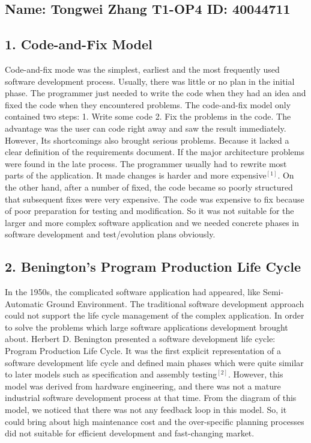 \documentclass[11pt]{report}
\begin{document}
\subsection*{Name: Tongwei Zhang\hspace{2cm} T1-OP4 \hspace{2cm}ID: 40044711 }
\subsection*{1. Code-and-Fix Model}
Code-and-fix mode was the simplest, earliest and the most frequently used software development process. Usually, there was little or no plan in the initial phase. The programmer just needed to write the code when they had an idea and fixed the code when they encountered problems. The code-and-fix model only contained two steps: 1. Write some code 2. Fix the problems in the code. The advantage was the user can code right away and saw the result immediately. However, Its shortcomings also brought serious problems. Because it lacked a clear definition of the requirements document. If the major architecture problems were found in the late process. The programmer usually had to rewrite most parts of the application. It made changes is harder and more expensive$^{[1]}$. On the other hand, after a number of fixed, the code became so poorly structured that subsequent fixes were very expensive. The code was expensive to fix because of poor preparation for testing and modification. So it was not suitable for the larger and more complex software application and we needed concrete phases in software development and test/evolution plans obviously.
\vspace{-0.3cm}
\subsection*{2. Benington's Program Production Life Cycle}
In the 1950s, the complicated software application had appeared, like Semi-Automatic Ground Environment. The traditional software development approach could not support the life cycle management of the complex application. In order to solve the problems which large software applications development brought about. Herbert D. Benington presented a software development life cycle: Program Production Life Cycle. It was the first explicit representation of a software development life cycle and defined main phases which were quite similar to later models such as specification and assembly testing$^{[2]}$. However, this model was derived from hardware engineering, and there was not a mature industrial software development process at that time. From the diagram of this model, we noticed that there was not any feedback loop in this model. So, it could bring about high maintenance cost and the over-specific planning processes did not suitable for efficient development and fast-changing market.
\vspace{-0.2cm}
\end{document}
